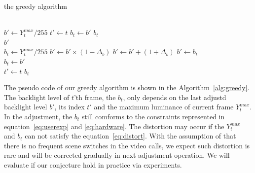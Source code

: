
\begin{algorithm}
  \caption{the greedy algorithm}
  \label{alg:greedy}
  \begin{algorithmic}[1]
    \\
      \State $b' \gets Y_{t}^{max} / 255$
      \State $t' \gets t$
      \State $b_t \gets b'$
      \Return $b_t$
    \EndIf
      \\
      \Return $b'$
    \EndIf
    \\

    \State $b_{t} \gets Y_{t}^{max} / 255$
      \State $b' \gets b' \times (1 - \Delta_{b})$
      \State $b' \gets b' + (1 + \Delta_{b})$
    \Else
      \State $b' \gets b_t$
    \EndIf
    \\
    \State $b_{t} \gets b'$\\
    \State $t' \gets t$
    \Return $b_{t}$
  \end{algorithmic}
  
\end{algorithm}

The pseudo code of 
our greedy algorithm is shown in the
Algorithm~\ref{alg:greedy}. The backlight level of $t$'th frame, the
$b_t$, only depends on the last adjustd backlight level $b'$, its
index $t'$ and the maximum luminance of current frame $Y_t^{max}$. In
the adjustment, the $b_t$ still comforms to the constraints represented
in equation~\ref{eq:userexp} and \ref{eq:hardware}. The distortion may
occur if the $Y_t^{max}$ and $b_t$ can not satisfy the
equation~\ref{eq:distort}. With the assumption of that there is no
frequent scene switches in the video calls, we expect such distortion
is rare and will be
corrected gradually in next adjustment operation. We will evaluate if
our conjecture hold in practice via experiments. 






